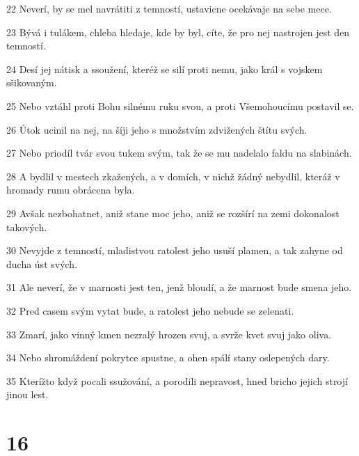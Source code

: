 \par 22 Neverí, by se mel navrátiti z temností, ustavicne ocekávaje na sebe mece.
\par 23 Bývá i tulákem, chleba hledaje, kde by byl, cíte, že pro nej nastrojen jest den temností.
\par 24 Desí jej nátisk a ssoužení, kteréž se silí proti nemu, jako král s vojskem sšikovaným.
\par 25 Nebo vztáhl proti Bohu silnému ruku svou, a proti Všemohoucímu postavil se.
\par 26 Útok ucinil na nej, na šíji jeho s množstvím zdvižených štítu svých.
\par 27 Nebo priodíl tvár svou tukem svým, tak že se mu nadelalo faldu na slabinách.
\par 28 A bydlil v mestech zkažených, a v domích, v nichž žádný nebydlil, kteráž v hromady rumu obrácena byla.
\par 29 Avšak nezbohatnet, aniž stane moc jeho, aniž se rozšírí na zemi dokonalost takových.
\par 30 Nevyjde z temností, mladistvou ratolest jeho usuší plamen, a tak zahyne od ducha úst svých.
\par 31 Ale neverí, že v marnosti jest ten, jenž bloudí, a že marnost bude smena jeho.
\par 32 Pred casem svým vytat bude, a ratolest jeho nebude se zelenati.
\par 33 Zmarí, jako vinný kmen nezralý hrozen svuj, a svrže kvet svuj jako oliva.
\par 34 Nebo shromáždení pokrytce spustne, a ohen spálí stany oslepených dary.
\par 35 Kterížto když pocali ssužování, a porodili nepravost, hned bricho jejich strojí jinou lest.

\chapter{16}


